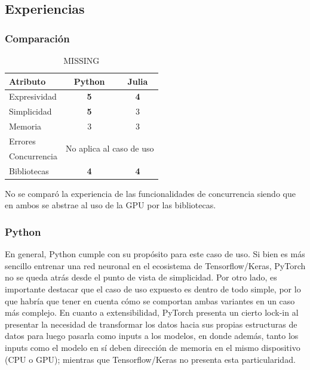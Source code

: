 \documentclass[11pt]{article}
\let\Oldsubsection\subsection
\renewcommand{\subsection}{\FloatBarrier\Oldsubsection}
\let\Oldsubsubsection\subsubsection
\renewcommand{\subsubsection}{\FloatBarrier\Oldsubsubsection}
\newcommand{\goodMetric}[1]{{\textbf{#1}}}
\begin{document}
\subsection{Experiencias}

\subsubsection{Comparación}

\begin{table}[h]
\centering
\begin{tabular}{|l|cc|}
\hline
Atributo & \multicolumn{1}{c|}{Python} & Julia \\ \hline
Expresividad & \multicolumn{1}{c|}{\goodMetric{5}} & \goodMetric{4} \\ \hline
Simplicidad & \multicolumn{1}{c|}{\goodMetric{5}} & 3 \\ \hline
Memoria & \multicolumn{1}{c|}{3} & 3 \\ \hline
Errores & \multicolumn{2}{c|}{\multirow{2}{*}{No aplica al caso de uso}} \\ \cline{1-1}
Concurrencia & \multicolumn{2}{c|}{} \\ \hline
Bibliotecas & \multicolumn{1}{c|}{\goodMetric{4}} & \goodMetric{4} \\ \hline
\end{tabular}
\caption{MISSING} %
\end{table}

No se comparó la experiencia de las funcionalidades de concurrencia siendo que en ambos se abstrae al uso de la GPU por las bibliotecas.

\subsubsection{Python}

En general, Python cumple con su propósito para este caso de uso. Si bien es más sencillo entrenar una red neuronal en el ecosistema de Tensorflow/Keras, PyTorch no se queda atrás desde el punto de vista de simplicidad. Por otro lado, es importante destacar que el caso de uso expuesto es dentro de todo simple, por lo que habría que tener en cuenta cómo se comportan ambas variantes en un caso más complejo. En cuanto a extensibilidad, PyTorch presenta un cierto lock-in al presentar la necesidad de transformar los datos hacia sus propias estructuras de datos para luego pasarla como inputs a los modelos, en donde además, tanto los inputs como el modelo en sí deben dirección de memoria en el mismo dispositivo (CPU o GPU); mientras que Tensorflow/Keras no presenta esta particularidad.
\end{document}
